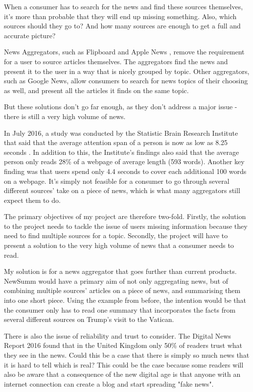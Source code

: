 \documentclass[12pt]{article}
\begin{document}
When a consumer has to search for the news and find these sources themselves, it's more than probable that they will end up missing something. Also, which sources should they go to? And how many sources are enough to get a full and accurate picture? 

News Aggregators, such as Flipboard \cite{flipboard} and Apple News \cite{appleNews}, remove the requirement for a user to source articles themselves. The aggregators find the news and present it to the user in a way that is nicely grouped by topic. Other aggregators, such as Google News, allow consumers to search for news topics of their choosing as well, and present all the articles it finds on the same topic.

But these solutions don't go far enough, as they don't address a major issue - there is still a very high volume of news.

In July 2016, a study was conducted by the Statistic Brain Research Institute \cite{statisticBrain} that said that the average attention span of a person is now as low as 8.25 seconds \cite{attentionSpan}. In addition to this, the Institute's findings also said that the average person only reads 28\% of a webpage of average length (593 words). Another key finding was that users spend only 4.4 seconds to cover each additional 100 words on a webpage. It's simply not feasible for a consumer to go through several different sources' take on a piece of news, which is what many aggregators still expect them to do.

The primary objectives of my project are therefore two-fold. Firstly, the solution to the project needs to tackle the issue of users missing information because they need to find multiple sources for a topic. Secondly, the project will have to present a solution to the very high volume of news that a consumer needs to read. 

My solution is for a news aggregator that goes further than current products. NewSumm would have a primary aim of not only aggregating news, but of combining multiple sources' articles on a piece of news, and summarising them into one short piece. Using the example from before, the intention would be that the consumer only has to read one summary that incorporates the facts from several different sources on Trump's visit to the Vatican.

There is also the issue of reliability and trust to consider. The Digital News Report 2016 \cite{digitalNewsReport} found that in the United Kingdom only 50\% of readers trust what they see in the news. Could this be a case that there is simply so much news that it is hard to tell which is real? This could be the case because some readers will also be aware that a consequence of the new digital age is that anyone with an internet connection can create a blog and start spreading "fake news". 
\end{document}
